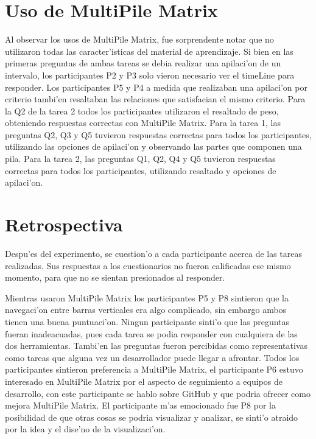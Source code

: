 \section{Uso de MultiPile Matrix}
Al observar los usos de MultiPile Matrix, fue sorprendente notar que no utilizaron todas las caracter'isticas del material de aprendizaje. Si bien en las primeras preguntas de ambas tareas se debia realizar una apilaci'on de un intervalo, los participantes P2 y P3 solo vieron necesario ver el timeLine para responder. Los participantes P5 y P4 a medida que realizaban una apilaci'on por criterio tambi'en resaltaban las relaciones que satisfacian el mismo criterio. Para la Q2 de la tarea 2 todos los participantes utilizaron el resaltado de peso, obteniendo respuestas correctas con MultiPile Matrix. Para la tarea 1, las preguntas Q2, Q3 y Q5 tuvieron respuestas correctas para todos los participantes, utilizando las opciones de apilaci'on y observando las partes que componen una pila. Para la tarea 2, las preguntas Q1, Q2, Q4 y Q5 tuvieron respuestas correctas para todos los participantes, utilizando resaltado y opciones de apilaci'on.

\section{Retrospectiva}
Despu'es del experimento, se cuestion'o a cada participante acerca de las tareas realizadas. Sus respuestas a los cuestionarios no fueron calificadas ese mismo momento, para que no se sientan presionados al responder.

Mientras usaron MultiPile Matrix los participantes P5 y P8 sintieron que la navegaci'on entre barras verticales era algo complicado, sin embargo ambos tienen una buena puntuaci'on. Ningun participante sinti'o que las preguntas fueran inadeacuadas, pues cada tarea se podia responder con cualquiera de las dos herramientas. Tambi'en las preguntas fueron percibidas como representativas como tareas que alguna vez un desarrollador puede llegar a afrontar. Todos los participantes sintieron preferencia a MultiPile Matrix, el participante P6 estuvo interesado en MultiPile Matrix por el aspecto de seguimiento a equipos de desarrollo, con este participante se hablo sobre GitHub y que podria ofrecer como mejora MultiPile Matrix. El participante m'as emocionado fue P8 por la posibilidad de que otras cosas se podria visualizar y analizar, se sinti'o atraido por la idea y el dise'no de la visualizaci'on.

